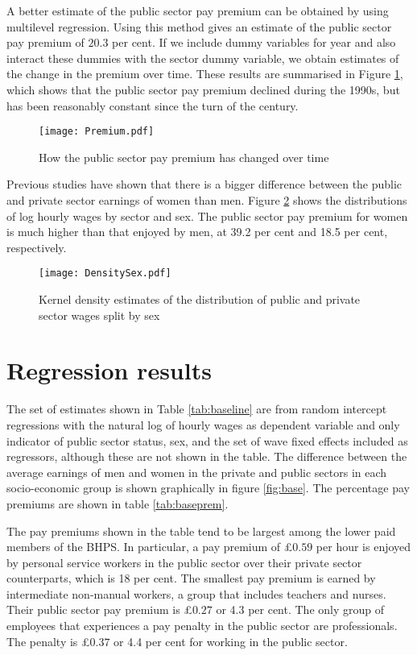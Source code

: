 \documentclass[a4paper,11pt,titlepage]{article}
\begin{document}
A better estimate of the public sector pay premium can be obtained by using multilevel regression.  Using this method gives an estimate of the public sector pay premium of $20.3$ per cent.  If we include dummy variables for year and also interact these dummies with the sector dummy variable, we obtain estimates of the change in the premium over time.  These results are summarised in Figure \ref{fig:premium}, which shows that the public sector pay premium declined during the 1990s, but has been reasonably constant since the turn of the century.

\begin{figure}[tb]
    \centering
    \texttt{[image: Premium.pdf]}
    \caption{How the public sector pay premium has changed over time\label{fig:premium}}
\end{figure}

Previous studies have shown that there is a bigger difference between the public and private sector earnings of women than men.  Figure \ref{fig:densitysex} shows the distributions of log hourly wages by sector and sex.  The public sector pay premium for women is much higher than that enjoyed by men, at 39.2 per cent and 18.5 per cent, respectively.

\begin{figure}[tb]
    \centering
    \texttt{[image: DensitySex.pdf]}
    \caption{Kernel density estimates of the distribution of public and private sector wages split by sex\label{fig:densitysex}}
\end{figure}

\section{Regression results}
The set of estimates shown in Table \ref{tab:baseline} are from random intercept regressions with the natural log of hourly wages as dependent variable and only indicator of public sector status, sex, and the set of wave fixed effects included as regressors, although these are not shown in the table.  The difference between the average earnings of men and women in the private and public sectors in each socio-economic group is shown graphically in figure \ref{fig:base}. The percentage pay premiums are shown in table \ref{tab:baseprem}.

The pay premiums shown in the table tend to be largest among the lower paid
members of the BHPS. In particular, a pay premium of \pounds $0.59$ per hour is enjoyed by personal service workers in the public sector over their private sector counterparts,
which is 18 per cent. The smallest pay premium is earned by intermediate non-manual
workers, a group that includes teachers and nurses. Their public sector pay premium
is \pounds $0.27$ or 4.3 per cent. The only group of employees that experiences a pay penalty in
the public sector are professionals. The penalty is \pounds $0.37$ or 4.4 per cent for working in
the public sector.
\end{document}
